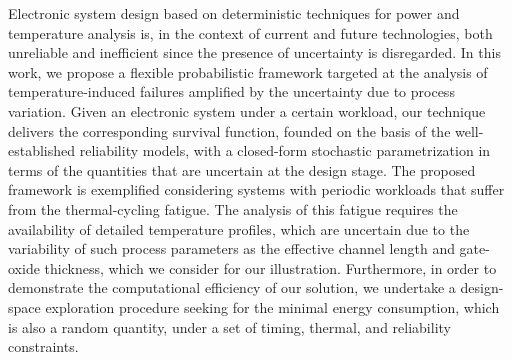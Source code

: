 Electronic system design based on deterministic techniques for power and temperature analysis is, in the context of current and future technologies, both unreliable and inefficient since the presence of uncertainty is disregarded.
In this work, we propose a flexible probabilistic framework targeted at the analysis of temperature-induced failures amplified by the uncertainty due to process variation.
Given an electronic system under a certain workload, our technique delivers the corresponding survival function, founded on the basis of the well-established reliability models, with a closed-form stochastic parametrization in terms of the quantities that are uncertain at the design stage.
The proposed framework is exemplified considering systems with periodic workloads that suffer from the thermal-cycling fatigue.
The analysis of this fatigue requires the availability of detailed temperature profiles, which are uncertain due to the variability of such process parameters as the effective channel length and gate-oxide thickness, which we consider for our illustration.
Furthermore, in order to demonstrate the computational efficiency of our solution, we undertake a design-space exploration procedure seeking for the minimal energy consumption, which is also a random quantity, under a set of timing, thermal, and reliability constraints.
